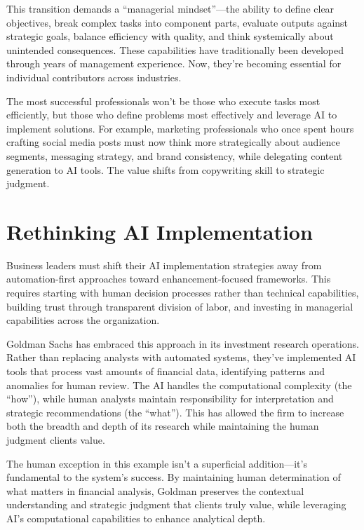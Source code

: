 \documentclass[
  Letterpaper,
]{scrbook}
\begin{document}
This transition demands a ``managerial mindset''---the ability to define
clear objectives, break complex tasks into component parts, evaluate
outputs against strategic goals, balance efficiency with quality, and
think systemically about unintended consequences. These capabilities
have traditionally been developed through years of management
experience. Now, they're becoming essential for individual contributors
across industries.

The most successful professionals won't be those who execute tasks most
efficiently, but those who define problems most effectively and leverage
AI to implement solutions. For example, marketing professionals who once
spent hours crafting social media posts must now think more
strategically about audience segments, messaging strategy, and brand
consistency, while delegating content generation to AI tools. The value
shifts from copywriting skill to strategic judgment.

\section{Rethinking AI
Implementation}\label{rethinking-ai-implementation}

Business leaders must shift their AI implementation strategies away from
automation-first approaches toward enhancement-focused frameworks. This
requires starting with human decision processes rather than technical
capabilities, building trust through transparent division of labor, and
investing in managerial capabilities across the organization.

Goldman Sachs has embraced this approach in its investment research
operations. Rather than replacing analysts with automated systems,
they've implemented AI tools that process vast amounts of financial
data, identifying patterns and anomalies for human review. The AI
handles the computational complexity (the ``how''), while human analysts
maintain responsibility for interpretation and strategic recommendations
(the ``what''). This has allowed the firm to increase both the breadth
and depth of its research while maintaining the human judgment clients
value.

The human exception in this example isn't a superficial addition---it's
fundamental to the system's success. By maintaining human determination
of what matters in financial analysis, Goldman preserves the contextual
understanding and strategic judgment that clients truly value, while
leveraging AI's computational capabilities to enhance analytical depth.
\end{document}
